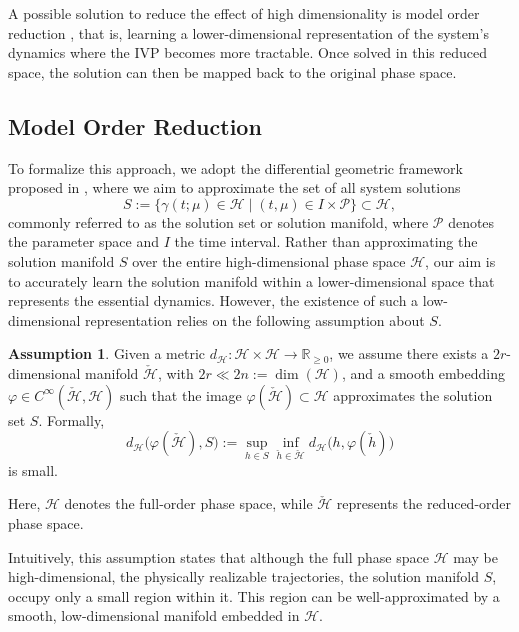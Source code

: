 \documentclass{article}
\theoremstyle{plain}
\theoremstyle{definition}
\newtheorem{assumption}[theorem]{Assumption}
\theoremstyle{remark}
\begin{document}
A possible solution to reduce the effect of high dimensionality is model order reduction \cite{model_order_reduction}, that is, learning a lower-dimensional representation of the system’s dynamics where the IVP becomes more tractable.  
Once solved in this reduced space, the solution can then be mapped back to the original phase space.

\subsection{Model Order Reduction}

To formalize this approach, we adopt the differential geometric framework proposed in \cite{buchfink2024}, where we aim to approximate the set of all system solutions
\[
S := \{ \gamma(t; \mu) \in \mathcal{H} \mid (t, \mu) \in I \times \mathcal{P} \} \subset \mathcal{H},
\]
commonly referred to as the solution set or solution manifold, where $\mathcal{P}$ denotes the parameter space and $I$ the time interval. Rather than approximating the solution manifold $S$ over the entire high-dimensional phase space $\mathcal{H}$, our aim is to accurately learn the solution manifold within a lower-dimensional space that represents the essential dynamics. However, the existence of such a low-dimensional representation relies on the following assumption about $S$.

\begin{assumption}
   Given a metric $d_{\mathcal{H}}: \mathcal{H} \times \mathcal{H} \to \mathbb{R}_{\geq 0}$, we assume there exists a $2r$-dimensional manifold $\check{\mathcal{H}}$, with $2r \ll 2n := \dim(\mathcal{H})$, and a smooth embedding $\varphi \in C^\infty(\check{\mathcal{H}}, \mathcal{H})$ such that the image $\varphi(\check{\mathcal{H}}) \subset \mathcal{H}$ approximates the solution set $S$. Formally,
\[
d_{\mathcal{H}} \big( \varphi(\check{\mathcal{H}}), S \big) := \sup_{h \in S} \inf_{\check{h} \in \check{\mathcal{H}}} d_{\mathcal{H}} \big(h, \varphi(\check{h}) \big)
\]
is small.

Here, $\mathcal{H}$ denotes the full-order phase space, while $\check{\mathcal{H}}$ represents the reduced-order phase space. 
\end{assumption}


Intuitively, this assumption states that although the full phase space $\mathcal{H}$ may be high-dimensional, the physically realizable trajectories, the solution manifold $S$, occupy only a small region within it. This region can be well-approximated by a smooth, low-dimensional manifold embedded in $\mathcal{H}$.
\end{document}
